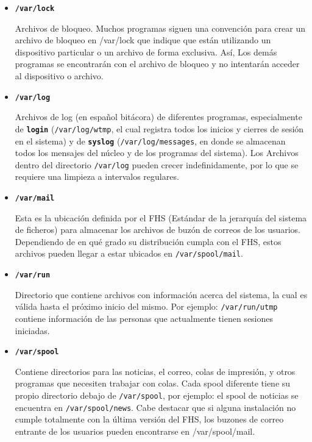 \documentclass[12pt]{article}
\begin{document}
\begin{itemize}
	\item 
        
	\textbf{\texttt{/var/lock}} 
        
	 Archivos de bloqueo. Muchos programas siguen una
	convención para crear un archivo de bloqueo en /var/lock que indique que
	están utilizando un dispositivo particular o un archivo de forma
	exclusiva. Así, Los demás programas se encontrarán con el archivo de
	bloqueo y no intentarán acceder al dispositivo o archivo.
	  

	\item 

	\textbf{\texttt{/var/log}} 

	  Archivos de log (en español bitácora) de diferentes
	 programas, especialmente de \texttt{\textbf{login}}
	 (\texttt{/var/log/wtmp}, el cual registra todos los inicios
	 y cierres de sesión en el sistema) y de \texttt{\textbf{syslog}}
	 (\texttt{/var/log/messages}, en donde se almacenan todos
	 los mensajes del núcleo y de los programas del sistema). Los Archivos
	 dentro del directorio \texttt{/var/log} pueden crecer
	 indefinidamente, por lo que se requiere una limpieza a intervalos
	 regulares.   

	\item 
        
	\textbf{\texttt{/var/mail}} 
        
	 Esta es la ubicación definida por el FHS (Estándar de la
	jerarquía del sistema de ficheros) para almacenar los archivos de buzón
	de correos de los usuarios. Dependiendo de en qué 		grado su
	distribución cumpla con el FHS, estos archivos pueden 	llegar a
	estar ubicados en \texttt{/var/spool/mail}.
	  

	\item 

	\textbf{\texttt{/var/run}} 
        
	 Directorio que contiene archivos con información acerca
	del sistema, la cual es válida hasta el próximo inicio del mismo. Por
	ejemplo: \texttt{/var/run/utmp} contiene información de las
	personas que actualmente tienen sesiones iniciadas.  
	 

	\item 
        
	\textbf{\texttt{/var/spool}} 
        
	 Contiene directorios para las noticias, el correo, colas
	de impresión, y otros programas que necesiten trabajar con colas.
	Cada spool diferente tiene su propio directorio debajo de
	\texttt{/var/spool}, por ejemplo: el spool de noticias se
	encuentra en \texttt{/var/spool/news}. Cabe destacar que si
	alguna instalación no cumple totalmente con la última versión del
	FHS, los buzones de correo entrante de los usuarios pueden encontrarse
	en /var/spool/mail.   


\end{itemize}
\end{document}
